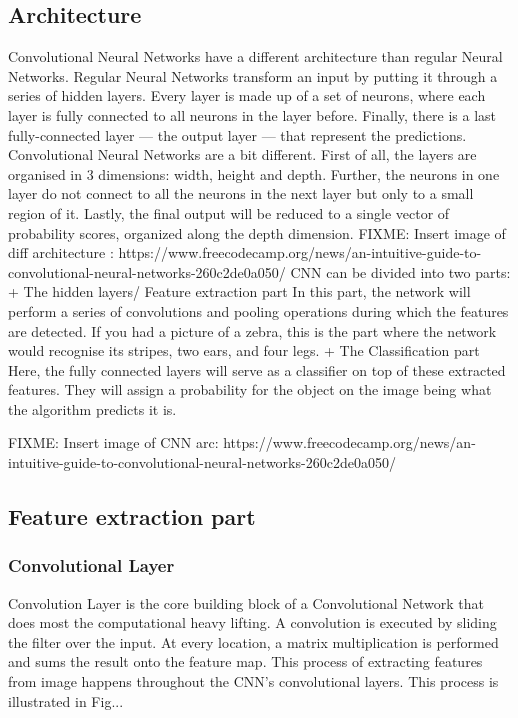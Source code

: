     \subsection{ Architecture }
      Convolutional Neural Networks have a different architecture than regular Neural Networks.
      Regular Neural Networks transform an input by putting it through a series of hidden layers. 
      Every layer is made up of a set of neurons, where each layer is fully connected to all neurons 
      in the layer before. Finally, there is a last fully-connected layer — the output layer — that 
      represent the predictions.
      Convolutional Neural Networks are a bit different. First of all, the layers are organised in 
      3 dimensions: width, height and depth. Further, the neurons in one layer do not connect to all 
      the neurons in the next layer but only to a small region of it. Lastly, the final output will 
      be reduced to a single vector of probability scores, organized along the depth dimension.
      FIXME: Insert image of diff architecture : https://www.freecodecamp.org/news/an-intuitive-guide-to-convolutional-neural-networks-260c2de0a050/
      CNN can be divided into two parts:
        + The hidden layers/ Feature extraction part
          In this part, the network will perform a series of convolutions and 
          pooling operations during which the features are detected. If you had a 
          picture of a zebra, this is the part where the network would recognise 
          its stripes, two ears, and four legs.
        + The Classification part
          Here, the fully connected layers will serve as a classifier on top of 
          these extracted features. They will assign a probability for the object 
          on the image being what the algorithm predicts it is.

        FIXME: Insert image of CNN arc: https://www.freecodecamp.org/news/an-intuitive-guide-to-convolutional-neural-networks-260c2de0a050/

    \subsection{ Feature extraction part }
      \subsubsection{ Convolutional Layer }
        Convolution Layer is the core building block of a Convolutional Network that does most
        the computational heavy lifting. A convolution is executed by sliding the filter over
        the input. At every location, a matrix multiplication is performed and sums the result onto 
        the feature map. This process of extracting features from image happens throughout the CNN's convolutional
        layers. This process is illustrated in Fig...

